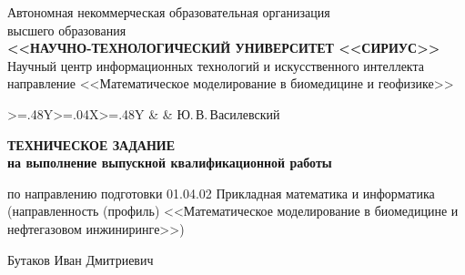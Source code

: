 \begin{spacing}{1.0}
\fontsize{12}{14.5}\selectfont

\begin{center}
    Автономная некоммерческая образовательная организация \\ высшего образования \\
    \textbf{<<НАУЧНО-ТЕХНОЛОГИЧЕСКИЙ УНИВЕРСИТЕТ <<СИРИУС>>} \\
    \vspace{0.66\baselineskip}
    Научный центр информационных технологий и искусственного интеллекта \\
    \vspace{0.66\baselineskip}
    направление <<Математическое моделирование в биомедицине и геофизике>> \\

    \vspace{1.5\baselineskip}

    \begin{tabularx}{\textwidth}{>{\hsize=.48\hsize}Y>{\hsize=.04\hsize}X>{\hsize=.48\hsize}Y}
        & & 
            {Ю.\,В.\,Василевский}
    \end{tabularx}

    \vspace{2.0\baselineskip}

    \textbf{\MakeUppercase{Техническое задание}} \\
    \textbf{на выполнение выпускной квалификационной работы}

    по направлению подготовки 01.04.02 Прикладная математика и информатика \\
    (направленность (профиль) <<Математическое моделирование в биомедицине и нефтегазовом инжиниринге>>) \\

    \vspace{\baselineskip}

    Бутаков Иван Дмитриевич

\end{center}


\end{spacing}
